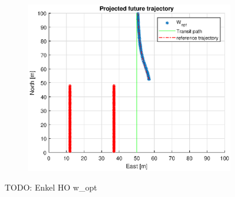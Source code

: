 \begin{figure}[!b]
\begin{subfigure}[b]{0.61\textwidth}
    \end{subfigure}
    \hfill
    \begin{subfigure}[b]{0.61\textwidth}
        \centering
        \includegraphics[width=\textwidth]{Images/Figures/Enkel_HO/Simple0_f999_Frame3}
    \end{subfigure}
    \caption{TODO: Enkel HO w\_opt}
\end{figure}

